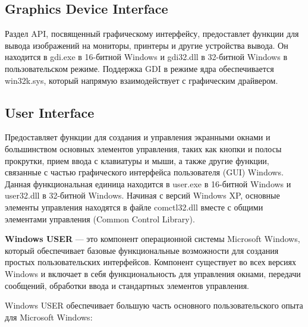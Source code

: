    \subsection{Graphics Device Interface}
    Раздел API, посвященный графическому интерфейсу, предоставлет функции для вывода изображений на мониторы, принтеры и другие устройства вывода.
    Он находится в gdi.exe в 16-битной Windows и gdi32.dll в 32-битной Windows в пользовательском режиме.
    Поддержка GDI в режиме ядра обеспечивается win32k.sys, который напрямую взаимодействует с графическим драйвером.

    \subsection{User Interface}
    Предоставляет функции для создания и управления экранными окнами и большинством основных элементов управления, таких как кнопки и полосы прокрутки, прием ввода с клавиатуры и мыши, а также другие функции, связанные с частью графического интерфейса пользователя (GUI) Windows.
    Данная функциональная единица находится в user.exe в 16-битной Windows и user32.dll в 32-битной Windows.
    Начиная с версий Windows XP, основные элементы управления находятся в файле comctl32.dll вместе с общими элементами управления (Common Control Library).

    \textbf{Windows USER} — это компонент операционной системы Microsoft Windows, который обеспечивает базовые функциональные возможности для создания простых пользовательских интерфейсов.
    Компонент существует во всех версиях Windows и включает в себя функциональность для управления окнами, передачи сообщений, обработки ввода и стандартных элементов управления.

    Windows USER обеспечивает большую часть основного пользовательского опыта для Microsoft Windows:

